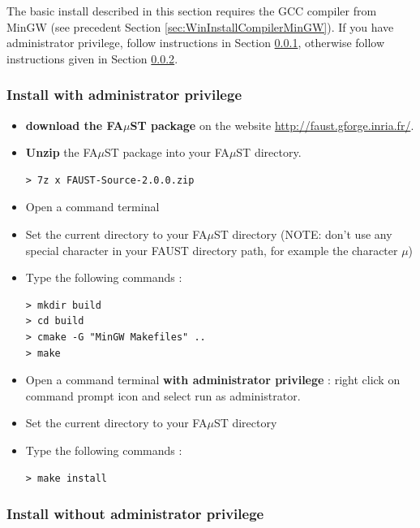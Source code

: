 The basic install described in this section requires the GCC compiler from MinGW (see precedent Section \ref{sec:WinInstallCompilerMinGW}).
If you have administrator privilege, follow instructions in Section \ref{sec:WinMinGWadminBasicInstall}, otherwise follow instructions given in Section \ref{sec:WinMinGWNoAdminBasicInstall}.
\subsubsection{Install with administrator privilege}
\label{sec:WinMinGWadminBasicInstall}
\begin{itemize}
\item \textbf{download the FA$\mu$ST package} on the website  \url{http://faust.gforge.inria.fr/}. 
\item \textbf{Unzip} the FA$\mu$ST package into your FA$\mu$ST directory. 
\begin{lstlisting}
> 7z x FAUST-Source-2.0.0.zip
\end{lstlisting}

\item Open a command terminal
\item Set the current directory to your FA$\mu$ST directory (NOTE: don't use any special character in your FAUST directory path, for example the character $\mu$)
\item Type the following commands : 
\begin{lstlisting}
> mkdir build
> cd build
> cmake -G "MinGW Makefiles" .. 
> make
\end{lstlisting}

\item Open a command terminal \textbf{with administrator privilege} : right click on command prompt icon and select run as administrator. 
\item Set the current directory to your FA$\mu$ST directory
\item Type the following commands : 
\begin{lstlisting}
> make install 
\end{lstlisting}
\end{itemize}

\subsubsection{Install without administrator privilege}
\label{sec:WinMinGWNoAdminBasicInstall}


